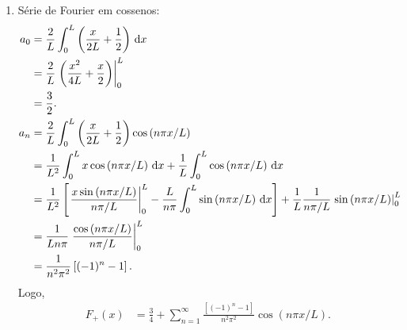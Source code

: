 \begin{exem}
\begin{enumerate}
        \item S\'{e}rie de Fourier em cossenos:
            \begin{align*}
                a_0 &= \frac{2}{L} \int_0^L \left( \frac{x}{2L} + \frac{1}{2} \right) \, \mathrm{d}x \\
                &= \frac{2}{L} \left. \left( \frac{x^2}{4 L} + \frac{x}{2} \right) \right|_0^L \\
                &= \frac{3}{2}. \\
                a_n &= \frac{2}{L} \int_0^L \left( \frac{x}{2L} + \frac{1}{2} \right) \cos\left( n \pi x / L \right) \\
                &= \frac{1}{L^2} \int_0^L x \cos\left( n \pi x / L \right) \, \mathrm{d}x + \frac{1}{L} \int_0^L \cos\left( n \pi x / L \right) \, \mathrm{d}x \\
                &= \frac{1}{L^2} \left[ \left. \frac{x \sin\left( n \pi x / L \right)}{n \pi / L} \right|_0^L - \frac{L}{n \pi} \int_0^L \sin\left( n \pi x / L \right) \, \mathrm{d}x \right] + \frac{1}{L} \frac{1}{n \pi / L} \left. \sin\left( n \pi x / L \right) \right|_0^L \\
                &= \frac{1}{L n \pi} \left. \frac{\cos\left( n \pi x / L \right)}{n \pi / L} \right|_0^L \\
                &= \frac{1}{n^2 \pi^2} \left[ (-1)^n - 1 \right].
            \end{align*}
            Logo,
            \begin{align*}
                F_+(x) &= \frac{3}{4} + \sum_{n = 1}^\infty \frac{\left[ (-1)^n - 1 \right]}{n^2 \pi^2} \cos\left( n \pi x / L \right).
            \end{align*}
    \end{enumerate}
\end{exem}

